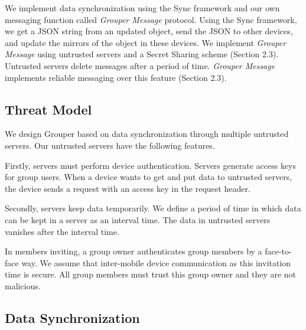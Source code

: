 \documentclass[twocolumn,10pt]{article}
\begin{document}
We implement data synchronization using the Sync framework\cite{sync} and our own messaging function called \emph{Grouper Message} protocol.
Using the Sync framework, we get a JSON string from an updated object, send the JSON to other devices, and update the mirrors of the object in these devices. 
We implement \emph{Grouper Message} using untrusted servers and a Secret Sharing scheme  (Section 2.3). 
Untrusted servers delete messages after a period of time. 
\emph{Grouper Message} implements reliable messaging over this feature (Section 2.3).

\subsection{Threat Model}

We design Grouper based on data synchronization through multiple untrusted servers. Our untrusted servers have the following features.

Firstly, servers must perform device authentication. 
Servers generate access keys for group users. 
When a device wants to get and put data to untrusted servers, the device sends a request with an access key in the request header.

Secondly, servers keep data temporarily.
We define a period of time in which data can be kept in a server as an interval time. 
The data in untrusted servers vanishes after the interval time.

In members inviting, a group owner authenticates group members by a face-to-face way. We assume that inter-mobile device communication as this invitation time is secure. All group members must trust this group owner and they are not malicious.

\subsection{Data Synchronization}
\end{document}
